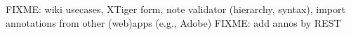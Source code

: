 
FIXME: wiki usecases, XTiger form, note validator (hierarchy, syntax), import
annotations from other (web)apps (e.g., Adobe)
FIXME: add annos by REST
